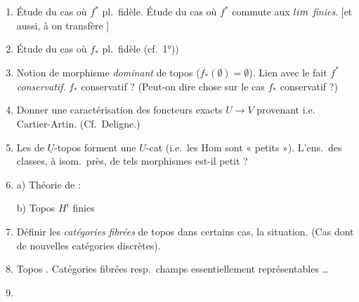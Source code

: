 \documentclass[11pt,a4paper]{article}
\begin{document}
\begin{enumerate}
\item[3)] Étude du cas où $f^{*}$ pl.\ fidèle. Étude du cas où $f^{*}$ commute
      aux $\varprojlim$ \emph{finies}. [et aussi, à \ill{} on transfère
      \ill{}]

\item[4)] Étude du cas où $f_{*}$ pl.\ fidèle (cf.\ 1°)) \ill{}

\item[5)] Notion de morphisme \emph{dominant} de topos
      ($f_{*}(\emptyset) = \emptyset$).  Lien avec le fait
      $f^{*}$ \emph{conservatif}. \ill{} $f_{*}$ conservatif ? (Peut-on dire
      \ill{} chose sur le cas $f_{*}$ conservatif ?)

\item[6)] Donner une caractérisation des foncteurs exacts $U \to V$ provenant
      \ill{} i.e.\ \ill{} Cartier-Artin. (Cf.\ Deligne.)

\item[7)] Les  de $\underline{U}$-topos forment une
      $U$-cat \ill{} (i.e.\ les $\mathrm{Hom}$ sont « petits »).
      L'ens.\ des classes, à isom.\ près, de tels morphismes est-il petit ?

\item[8)] a) Théorie de \ill{} :


      b) Topos \ill{} $H^{i}$ \ill{} \ill{} finies \ill{}

\item[9)] Définir \struck{\ill{}} les \emph{catégories} \emph{fibrées} de
      topos \ill{} dans certains cas, la situation. (Cas dont
       de nouvelles catégories \ill{} discrètes).

\item[10)] Topos \ill{}. Catégories fibrées resp.\ champs \ill{}
      essentiellement représentables \ldots

\item[11)] 

\end{enumerate}
\end{document}
